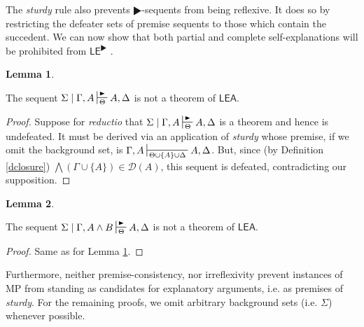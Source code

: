 \documentclass{article}
\theoremstyle{definition}
\theoremstyle{definition}
\theoremstyle{definition}
\newtheorem{lemma}{Lemma}
\theoremstyle{definition}
\theoremstyle{remark}
\theoremstyle{definition}
\theoremstyle{definition}
\begin{document}
The \textit{sturdy} rule also prevents $ \RHD $-sequents from being reflexive. It does so by restricting the defeater sets of premise sequents to those which contain the succedent. We can now show that both partial and complete self-explanations will be prohibited from $ \mathsf{LE}^\RHD$ .

\begin{lemma}\label{irrefl}
	
	The sequent $ \Sigma\mid \Gamma, A \sststile{\Theta}{\RHD}  A, \Delta $ is not a theorem of $ \mathsf{LEA}$.
	
	\begin{proof}
		Suppose for \textit{reductio} that $ \Sigma\mid \Gamma, A \sststile{\Theta}{\RHD}  A, \Delta $ is a theorem and hence is undefeated. It must be derived via an application of \textit{sturdy} whose premise, if we omit the background set, is $ \Gamma, A \sststile{\Theta\cup\{A\}\cup\Delta}{}  A, \Delta $. But, since (by Definition \ref{dclosure}) $ \bigwedge(\Gamma\cup\{A\}) \in \mathcal{D}(A) $, this sequent is defeated, contradicting our supposition.  
	\end{proof}
\end{lemma}

\begin{lemma}\label{part_irreflex}
	
	The sequent $ \Sigma\mid \Gamma, A \wedge B \sststile{\Theta}{\RHD}  A, \Delta $ is not a theorem of $ \mathsf{LEA}$.
	
	\begin{proof}
		Same as for Lemma \ref{irrefl}.
	\end{proof}
\end{lemma}

Furthermore, neither premise-consistency, nor irreflexivity prevent instances of \textsf{MP} from standing as candidates for explanatory arguments, i.e. as premises of \textit{sturdy}. For the remaining proofs, we omit arbitrary background sets (i.e. $ \Sigma $) whenever possible.

\end{document}
